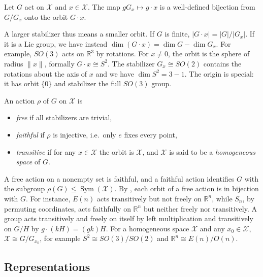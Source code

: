 \documentclass[mathematics,review,submit,moreauthors]{Definitions/mdpi}
\begin{document}
\begin{Theorem}\label{thm:orbit-stabilizer}
    Let $G$ act on $\mathcal{X}$ and $x\in\mathcal{X}$.
    The map $gG_x\mapsto g\cdot x$ is a well-defined bijection from $G/G_x$ onto the orbit $G\cdot x$.
\end{Theorem}

A larger stabilizer thus means a smaller orbit.
If $G$ is finite, $|G\cdot x|=|G|/|G_x|$.
If it is a Lie group, we have instead $\dim(G\cdot x)=\dim G-\dim G_x$.
For example, $SO(3)$ acts on $\mathbb{R}^3$ by rotations.
For $x\neq0$, the orbit is the sphere of radius $\lVert x\rVert$, formally $G\cdot x\cong S^2$. 
The stabilizer $G_x\cong SO(2)$ contains the rotations about the axis of $x$ and we have $\dim S^2=3-1$.
The origin is special: it has orbit $\{0\}$ and stabilizer the full $SO(3)$ group.

\begin{Definition}\label{def:free-transitive}
    An action $\rho$ of $G$ on $\mathcal{X}$ is
    \begin{itemize}
        \item \emph{free} if all stabilizers are trivial,
        \item \emph{faithful} if $\rho$ is injective, i.e.\ only $e$ fixes every point,
        \item \emph{transitive} if for any $x\in \mathcal{X}$ the orbit is $\mathcal{X}$, and $\mathcal{X}$ is said to be a \emph{homogeneous space} of $G$.
    \end{itemize}
\end{Definition}

A free action on a nonempty set is faithful, and a faithful action identifies $G$ with the subgroup $\rho(G)\le\operatorname{Sym}(\mathcal{X})$.
By , each orbit of a free action is in bijection with $G$.
For instance, $E(n)$ acts transitively but not freely on $\mathbb{R}^n$, while $S_n$, by permuting coordinates, acts faithfully on $\mathbb{R}^n$ but neither freely nor transitively.\newline
A group acts transitively and freely on itself by left multiplication and transitively on $G/H$ by $g\cdot(kH)=(gk)H$.
For a homogeneous space $\mathcal{X}$ and any $x_0\in \mathcal{X}$, $\mathcal{X}\cong G/G_{x_0}$, for example $S^2\cong SO(3)/SO(2)$ and $\mathbb{R}^n\cong E(n)/O(n)$.

\subsection{Representations}\label{sec:representations}
\end{document}
